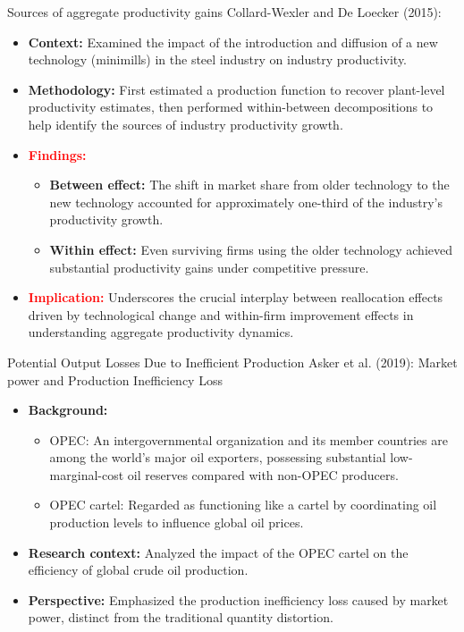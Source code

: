 \documentclass[aspectratio=169]{beamer}  %
\begin{document}
\begin{frame}{Sources of aggregate productivity gains}
    Collard-Wexler and De Loecker (2015): 
    \begin{itemize}
        \item \textbf{Context:} Examined the impact of the introduction and diffusion of a new technology (minimills) in the steel industry on industry productivity.
        \item \textbf{Methodology:} First estimated a production function to recover plant-level productivity estimates, then performed within-between decompositions to help identify the sources of industry productivity growth. 
        \item \textcolor{red}{\textbf{Findings:}}
        \begin{itemize}
            \item \textbf{Between effect:} The shift in market share from older technology to the new technology accounted for approximately one-third of the industry's productivity growth.
            \item \textbf{Within effect:} Even surviving firms using the older technology achieved substantial productivity gains under competitive pressure.
        \end{itemize}
        \item \textcolor{red}{\textbf{Implication:}} Underscores the crucial interplay between reallocation effects driven by technological change and within-firm improvement effects in understanding aggregate productivity dynamics.
    \end{itemize}
\end{frame}

\begin{frame}{Potential Output Losses Due to Inefficient Production}
    Asker et al. (2019): Market power and Production Inefficiency Loss
    \begin{itemize}
        \item \textbf{Background:}
        \begin{itemize}
            \item OPEC: An intergovernmental organization and its member countries are among the world's major oil exporters, possessing substantial low-marginal-cost oil reserves compared with non-OPEC producers.
            \item OPEC cartel: Regarded as functioning like a cartel by coordinating oil production levels to influence global oil prices.
        \end{itemize}
        \item \textbf{Research context:} Analyzed the impact of the OPEC cartel on the efficiency of global crude oil production.
        \item \textbf{Perspective:} Emphasized the production inefficiency loss caused by market power, distinct from the traditional quantity distortion.
    \end{itemize}
\end{frame}
\end{document}
